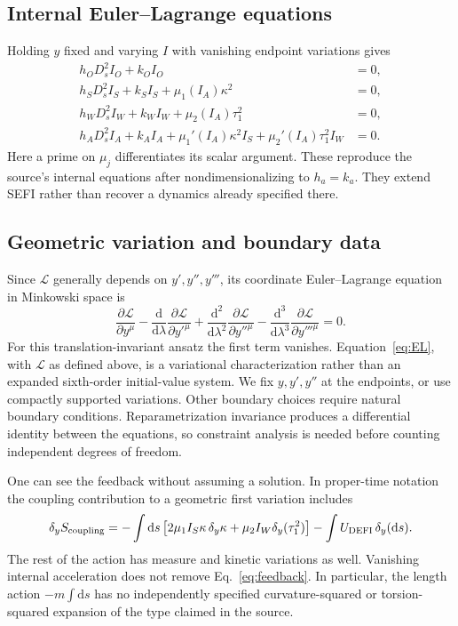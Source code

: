 \documentclass[aip,jmp,reprint,onecolumn,amsmath,amssymb]{revtex4-2}
\newcommand{\dd}{\mathrm{d}}
\newcommand{\Ds}{D_s}
\newcommand{\U}{U_{\mathrm{DEFI}}}
\begin{document}
\subsection{Internal Euler--Lagrange equations}
Holding $y$ fixed and varying $I$ with vanishing endpoint variations gives
\begin{align}
 h_O\Ds^2 I_O+k_O I_O&=0,\label{eq:origin}\\
 h_S\Ds^2 I_S+k_S I_S+\mu_1(I_A)\kappa^2&=0,\label{eq:S}\\
 h_W\Ds^2 I_W+k_W I_W+\mu_2(I_A)\tau_1^2&=0,\label{eq:W}\\
 h_A\Ds^2 I_A+k_A I_A
 +\mu_1'(I_A)\kappa^2 I_S+\mu_2'(I_A)\tau_1^2 I_W&=0.\label{eq:A}
\end{align}
Here a prime on $\mu_j$ differentiates its scalar argument. These reproduce the source's internal equations after nondimensionalizing to $h_a=k_a$. They extend SEFI rather than recover a dynamics already specified there.

\subsection{Geometric variation and boundary data}
Since $\mathcal L$ generally depends on $y',y'',y'''$, its coordinate Euler--Lagrange equation in Minkowski space is
\begin{equation}
 \frac{\partial\mathcal L}{\partial y^\mu}
 -\frac{\dd}{\dd\lambda}\frac{\partial\mathcal L}{\partial y'^\mu}
 +\frac{\dd^2}{\dd\lambda^2}\frac{\partial\mathcal L}{\partial y''^\mu}
 -\frac{\dd^3}{\dd\lambda^3}\frac{\partial\mathcal L}{\partial y'''^\mu}=0.
 \label{eq:EL}
\end{equation}
For this translation-invariant ansatz the first term vanishes. Equation~\eqref{eq:EL}, with $\mathcal L$ as defined above, is a variational characterization rather than an expanded sixth-order initial-value system. We fix $y,y',y''$ at the endpoints, or use compactly supported variations. Other boundary choices require natural boundary conditions. Reparametrization invariance produces a differential identity between the equations, so constraint analysis is needed before counting independent degrees of freedom.

One can see the feedback without assuming a solution. In proper-time notation the coupling contribution to a geometric first variation includes
\begin{equation}
 \delta_y S_{\rm coupling}
 =-\int\dd s\left[2\mu_1 I_S\kappa\,\delta_y\kappa
       +\mu_2 I_W\delta_y(\tau_1^2)\right]
   -\int \U\,\delta_y(\dd s).
 \label{eq:feedback}
\end{equation}
The rest of the action has measure and kinetic variations as well. Vanishing internal acceleration does not remove Eq.~\eqref{eq:feedback}. In particular, the length action $-m\int\dd s$ has no independently specified curvature-squared or torsion-squared expansion of the type claimed in the source.
\end{document}

